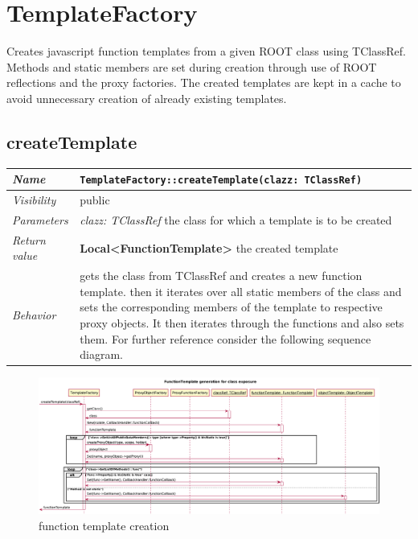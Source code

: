 \chapter{TemplateFactory}
Creates javascript function templates from a given ROOT class using TClassRef. Methods and static members are set during creation through use of ROOT reflections and the proxy factories. 
The created templates are kept in a cache to avoid unnecessary creation of already existing templates.
\section{createTemplate}
\begin{longtable}{p{3cm} @{\hskip 1cm} p{12cm}}
 \hline
\textit{Name} & \texttt{TemplateFactory::createTemplate(clazz: TClassRef)}\\
\hline
 \textit{Visibility} & public\\
\hline
\textit{Parameters} & \textit{clazz: TClassRef} the class for which a template is to be created \\
\hline
\textit{Return value} & \textbf{ Local<FunctionTemplate>} the created template\\
  \hline
 \textit{Behavior} & gets the class from TClassRef and creates a new function template. 
			then it iterates over all static members of the class and sets the
			corresponding members of the template to respective proxy objects.
			It then iterates through the functions and also sets them.
			For further reference consider the following sequence diagram.\\
\hline
\end{longtable} \pagebreak
 
\begin{figure}[htb]
\includegraphics[width=16cm]{./latex/resources/functionTemplateGenerate.pdf}
	\caption{function template creation}
\end{figure}
